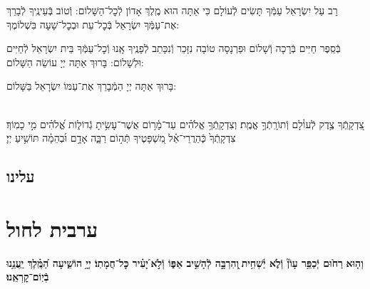 \documentclass[twoside, openany, parskip=half, 11pt]{book}
\begin{document}
\retzeh

\yaalehveyavo

\zion

\modim

\shabboschanukah

\shabboshodos

רָב עַל יִשְׂרָאֵל עַמְּֿךָ תָּשִׂים לְֿעוֹלָם כִּי אַתָּה הוּא מֶֽלֶךְ אָדוֹן לְֿכׇל־הַשָּׁלוֹם: וְֿטוֹב בְּֿעֵינֶֽיךָ לְֿבָרֵךְ אֶת־עַמְּֿךָ יִשְׂרָאֵל בְּֿכׇל־עֵת וּבְכׇל־שָׁעָה בִּשְׁלוֹמֶךָ:
\vspace{-0.4\baselineskip}
\begin{paracol}{2}
	
	\begin{small}
		בְּֿסֵֽפֶר חַיִּים בְּֿרָכָה וְֿשָׁלוֹם וּפַרְנָסָה טוֹבָה נִזָּכֵר וְֿנִכָּתֵב לְֿפָנֶֽיךָ אָֽנוּ וְֿכׇל־עַמְּֿךָ בֵּית יִשְׂרָאֵל לְֿחַיִּים וּלְשָׁלוֹם: בָּרוּךְ אַתָּה יְיָ עוֹשֵׂה הַשָּׁלוֹם:
		
	\end{small}
	\switchcolumn
	בָּרוּךְ אַתָּה יְיָ הַמְֿבָרֵךְ אֶת־עַמּוֹ יִשְׂרָאֵל בַּשָּׁלוֹם:
	
\end{paracol}

\tachanunim

\\
 צִ֭דְקָֽתְֿךָ צֶ֥דֶק לְֿעוֹ֗לָם וְֿתוֹרָֽתְֿךָ֥ אֱמֶֽת׃ וְצִדְקָֽתְֿךָ֥ אֱלֹהִ֗ים עַד־מָ֫ר֥וֹם אֲשֶׁר־עָשִׂ֥יתָ גְֿדוֹל֑וֹת אֱ֝לֹהִ֗ים מִ֣י כָמֽוֹךָ׃ צִדְקָֽתְֿךָ֙ כְּֽֿהַרֲרֵי־אֵ֗ל מִ֭שְׁפָּטֶיךָ תְּֿה֣וֹם רַבָּ֑ה אָדָ֥ם וּ֜בְהֵמָ֗ה תּוֹשִׁ֥יעַ יְיָ׃

\fullkaddish

\section*{ עלינו }

\aleinu





%
\chapter[ערבית לחול]{ ערבית לחול }

\textbf{וְה֤וּא}\textbf{
	רַח֙וּם יְֿכַפֵּ֥ר עָוֹן֘ וְֿלֹ֢א יַ֫שְׁחִ֥ית ֖וְהִרְבָּ֣ה לְֿהָשִׁ֣יב אַפּ֑וֹ וְֿלֹ֣א ֝יָעִ֗יר כׇּל־חֲמָתֽוֹ׃ יְיָ֥ הוֹשִׁ֑יעָה הַ֝מֶּֽ֗לֶךְ יַֽעֲנֵ֥נוּ בְֿיֽוֹם־קׇרְאֵֽנוּ׃}
\end{document}
